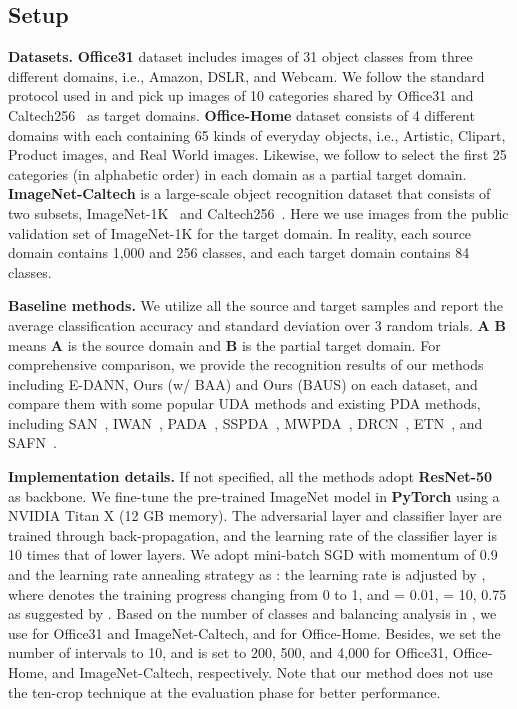 \documentclass[runningheads]{llncs}
\begin{document}
\subsection{Setup}
\textbf{Datasets.} \textbf{Office31} dataset \cite{saenko2010adapting} includes images of 31 object classes from three different domains, i.e., Amazon, DSLR, and Webcam. We follow the standard protocol used in \cite{cao2018partial} and pick up images of 10 categories shared by Office31 and Caltech256~\cite{griffin2007caltech} as target domains. \textbf{Office-Home} dataset  \cite{venkateswara2017deep}  consists of 4 different domains with each containing 65 kinds of everyday objects, i.e., Artistic, Clipart, Product images, and Real World images. Likewise, we follow \cite{cao2018partial} to select the first 25 categories (in alphabetic order) in each domain as a partial target domain. 
\textbf{ImageNet-Caltech} is a large-scale object recognition dataset that consists of two subsets, ImageNet-1K~\cite{russakovsky2015imagenet} and Caltech256~\cite{griffin2007caltech}.
Here we use images from the public validation set of ImageNet-1K for the target domain. 
In reality, each source domain contains 1,000 and 256 classes, and each target domain contains 84 classes.
	
\textbf{Baseline methods.} We utilize all the source and target samples and report the average classification accuracy and standard deviation over 3 random trials. \textbf{A}  \textbf{B} means \textbf{A} is the source domain and \textbf{B} is the partial target domain.
For comprehensive comparison, we provide the recognition results of our methods including E-DANN, Ours (w/ BAA) and Ours (BAUS) on each dataset, and compare them with some popular UDA methods \cite{tzeng2017adversarial,long2018conditional} and existing PDA methods, including SAN~\cite{cao2018partialb}, IWAN~\cite{zhang2018importance}, PADA~\cite{cao2018partial}, SSPDA~\cite{bucci2019tackling}, MWPDA~\cite{hu2019multi}, DRCN~\cite{li2020deep}, ETN~\cite{cao2019learning}, and SAFN~\cite{xu2019unsupervised}.
	
	
\textbf{Implementation details.} If not specified, all the methods adopt \textbf{ResNet-50}~\cite{he2016deep} as backbone.
We fine-tune the pre-trained ImageNet model in \textbf{PyTorch} using a {NVIDIA Titan X} (12 GB memory). 
The adversarial layer and classifier layer are trained through back-propagation, and the learning rate of the classifier layer is 10 times that of lower layers.
We adopt mini-batch SGD with momentum of 0.9 and the learning rate annealing strategy as \cite{ganin2016domain,long2018conditional}: the learning rate is adjusted by , where  denotes the training progress changing from 0 to 1, and  = 0.01,  = 10,  0.75 as suggested by \cite{long2018conditional}. 
Based on the number of classes and balancing analysis in \cite{chen2019complement}, we use  for Office31 and ImageNet-Caltech, and  for Office-Home.
Besides, we set the number of intervals  to 10, and  is set to 200, 500, and 4,000 for Office31, Office-Home, and ImageNet-Caltech, respectively.
Note that our method does not use the ten-crop technique \cite{cao2018partial,long2018conditional} at the evaluation phase for better performance.
\end{document}
